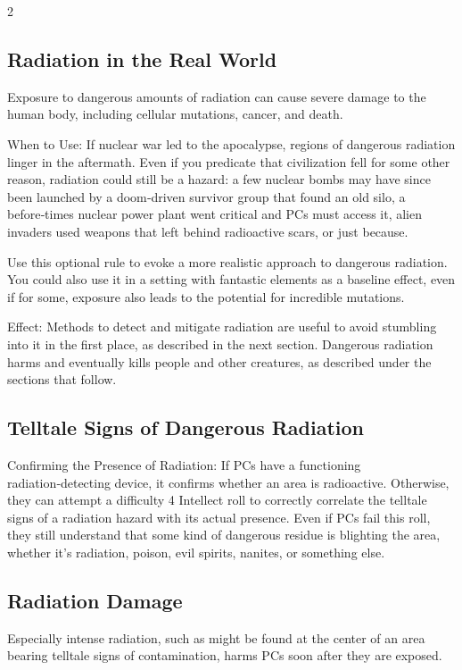 \begin{multicols}{2}
\subsection{Radiation in the Real World}

Exposure to dangerous amounts of radiation can cause severe damage to the human body, including cellular mutations, cancer, and death. 

When to Use: If nuclear war led to the apocalypse, regions of dangerous radiation linger in the aftermath. Even if you predicate that civilization fell for some other reason, radiation could still be a hazard: a few nuclear bombs may have since been launched by a doom‑driven survivor group that found an old silo, a before‑times nuclear power plant went critical and PCs must access it, alien invaders used weapons that left behind radioactive scars, or just because. 

Use this optional rule to evoke a more realistic approach to dangerous radiation. You could also use it in a setting with fantastic elements as a baseline effect, even if for some, exposure also leads to the potential for incredible mutations. 

Effect: Methods to detect and mitigate radiation are useful to avoid stumbling into it in the first place, as described in the next section. Dangerous radiation harms and eventually kills people and other creatures, as described under the sections that follow.

\subsection{Telltale Signs of Dangerous Radiation}

Confirming the Presence of Radiation: If PCs have a functioning radiation‑detecting device, it confirms whether an area is radioactive. Otherwise, they can attempt a difficulty 4 Intellect roll to correctly correlate the telltale signs of a radiation hazard with its actual presence. Even if PCs fail this roll, they still understand that some kind of dangerous residue is blighting the area, whether it’s radiation, poison, evil spirits, nanites, or something else.

\subsection{Radiation Damage}

Especially intense radiation, such as might be found at the center of an area bearing telltale signs of contamination, harms PCs soon after they are exposed. 


\end{multicols}
